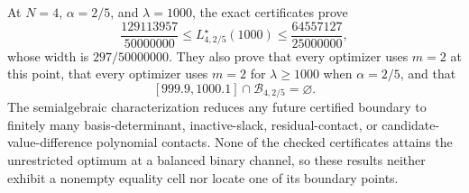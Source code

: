 At \(N=4\), \(\alpha=2/5\), and \(\lambda=1000\), the exact certificates prove
\[
\frac{129113957}{50000000}
\le L^\star_{4,2/5}(1000)
\le \frac{64557127}{25000000},
\]
whose width is \(297/50000000\).  They also prove that every optimizer uses \(m=2\) at this point, that every optimizer uses \(m=2\) for \(\lambda\ge1000\) when \(\alpha=2/5\), and that
\[
[999.9,1000.1]\cap\mathcal B_{4,2/5}=\varnothing.
\]
The semialgebraic characterization reduces any future certified boundary to finitely many basis-determinant, inactive-slack, residual-contact, or candidate-value-difference polynomial contacts.  None of the checked certificates attains the unrestricted optimum at a balanced binary channel, so these results neither exhibit a nonempty equality cell nor locate one of its boundary points.
